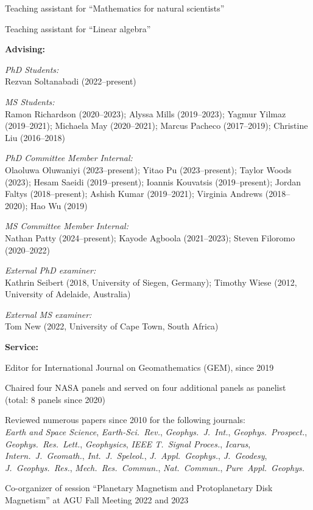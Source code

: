 \documentclass[10pt]{article}
\begin{document}
Teaching assistant for ``Mathematics for natural scientists''

Teaching assistant for ``Linear algebra''


\spc
\textbf{\tsize Advising:}

\spcp
\emph{PhD Students:}\\
Rezvan Soltanabadi (2022--present) 

\spcp
\emph{MS Students:}\\
Ramon Richardson (2020--2023); 
Alyssa Mills (2019--2023);
Yagmur Yilmaz (2019--2021);
Michaela May (2020--2021);
Marcus Pacheco (2017--2019);
Christine Liu (2016--2018) 

\spcp
\emph{PhD Committee Member Internal:}\\
Olaoluwa Oluwaniyi (2023--present);
Yitao Pu (2023--present);
Taylor Woods (2023);
Hesam Saeidi (2019--present);
Ioannis Kouvatsis (2019--present);
Jordan Faltys (2018--present);
Ashish Kumar (2019--2021);
Virginia Andrews (2018--2020);
Hao Wu (2019)

\spcp
\emph{MS Committee Member Internal:}\\
Nathan Patty (2024--present);
Kayode Agboola (2021--2023);
Steven Filoromo (2020--2022) 

\spcp
\emph{External PhD examiner:}\\
Kathrin Seibert (2018, University of Siegen, Germany);
Timothy Wiese (2012, University of Adelaide, Australia)

\spcp
\emph{External MS examiner:}\\
Tom New (2022, University of Cape Town, South Africa)


\spc
\textbf{\tsize Service:}

\spcp
Editor for International Journal on Geomathematics (GEM), since 2019

\spcp
Chaired four NASA panels and served on four
additional panels as panelist (total: 8 panels since 2020)

\spcp
Reviewed numerous papers since 2010 for the following journals:\\
\emph{Earth and Space Science},
\emph{Earth-Sci.~Rev.},
\emph{Geophys.~J.~Int.},
\emph{Geophys.~Prospect.},
\emph{Geophys.~Res.~Lett.},
\emph{Geophysics},
\emph{IEEE T.~Signal Proces.},
\emph{Icarus},
\emph{Intern.~J.~Geomath.},
\emph{Int.~J.~Speleol.},
\emph{J.~Appl.~Geophys.},
\emph{J.~Geodesy},
\emph{J.~Geophys.~Res.},
\emph{Mech.~Res.~Commun.},
\emph{Nat.~Commun.},
\emph{Pure~Appl.~Geophys.}

\spcp
Co-organizer of session ``Planetary Magnetism and Protoplanetary Disk Magnetism'' at AGU Fall Meeting 2022 and 2023
\end{document}
